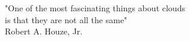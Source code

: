 \begin{dedication}

"One of the most fascinating things about clouds \\
is that they are not all the same"\\

 Robert A. Houze, Jr.\\

\end{dedication}
